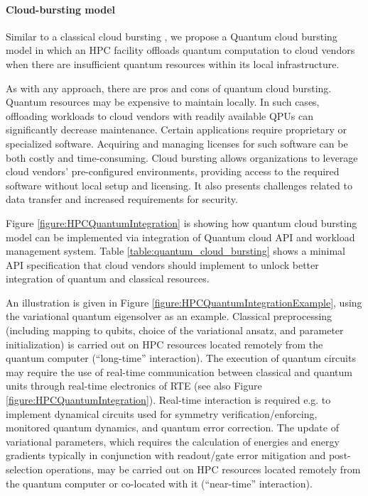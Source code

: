 \paragraph{\textbf{Cloud-bursting model}}



Similar to a classical cloud bursting \cite{bicer2011cloudbursting}, we propose a Quantum cloud bursting model in which an HPC facility offloads quantum computation to cloud vendors when there are insufficient quantum resources within its local infrastructure.

As with any approach, there are pros and cons of quantum cloud bursting. 
Quantum resources may be expensive to maintain locally. In such cases, offloading workloads to cloud vendors with readily available QPUs can significantly decrease maintenance. 
Certain applications require proprietary or specialized software. Acquiring and managing licenses for such software can be both costly and time-consuming. Cloud bursting allows organizations to leverage cloud vendors' pre-configured environments, providing access to the required software without local setup and licensing.
It also presents challenges related to data transfer and increased requirements for security.



Figure \ref{figure:HPCQuantumIntegration} is showing how quantum cloud bursting model can be implemented via integration of Quantum cloud API and workload management system. Table \ref{table:quantum_cloud_bursting} shows a minimal API specification that cloud vendors should implement to unlock better integration of quantum and classical resources.

An illustration is given in Figure \ref{figure:HPCQuantumIntegrationExample}, using the variational quantum eigensolver as an example. Classical preprocessing (including mapping to qubits, choice of the variational ansatz, and parameter initialization) is carried out on HPC resources located remotely from the quantum computer (``long-time'' interaction). The execution of quantum circuits may require the use of real-time communication between classical and quantum units through real-time electronics of RTE (see also Figure \ref{figure:HPCQuantumIntegration}). Real-time interaction is required e.g. to implement dynamical circuits used for symmetry verification/enforcing, monitored quantum dynamics, and quantum error correction.
The update of variational parameters, which requires the calculation of energies and energy gradients typically in conjunction with readout/gate error mitigation and post-selection operations, may be carried out on HPC resources located remotely from the quantum computer or co-located with it (``near-time'' interaction).

